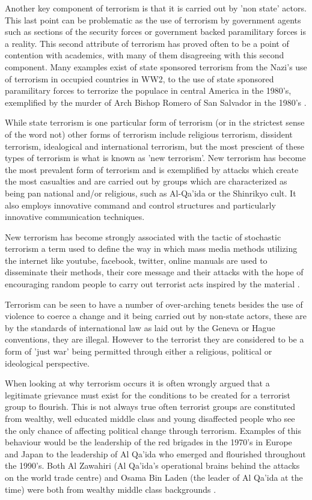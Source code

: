 Another key component of terrorism is that it is carried out by 'non state' actors. This last point can be problematic as the use of terrorism by government agents such as sections of the security forces or government backed paramilitary forces is a reality. This second attribute of terrorism has proved often to be a point of contention with academics, with many of them disagreeing with this second component. Many examples exist of state sponsored terrorism from the Nazi's use of terrorism in occupied countries in WW2, to the use of state sponsored paramilitary forces to terrorize the populace in central America in the  1980's, exemplified by the murder of Arch Bishop Romero of San Salvador in the 1980's \citep{romero1998violence}. 

While state terrorism is one particular form of terrorism (or in the strictest sense of the word not) other forms of terrorism include religious terrorism, dissident terrorism, idealogical and international terrorism, but the most prescient of these types of terrorism is what is known as 'new terrorism'. New terrorism has become the most prevalent form of terrorism and is exemplified by attacks which create the most casualties and are carried out by groups which are characterized as being pan national and/or religious, such as Al-Qa'ida or the Shinrikyo cult. It also employs innovative command and control structures and particularly innovative communication techniques. 

New terrorism has become strongly associated with the tactic of stochastic terrorism a term used to define the way in which mass media methods utilizing the internet like youtube, facebook, twitter, online manuals are used to disseminate their methods, their core message and their attacks with the hope of encouraging random people to carry out terrorist acts inspired by the material \citep{margulies2016trump}. 

Terrorism can be seen to have a number of over-arching tenets besides the use of violence to coerce a change and it being carried out by non-state actors, these are by the standards of international law as laid out by the Geneva or Hague conventions, they are illegal. However to the terrorist they are considered to be a form of 'just war' being permitted through either a religious, political or ideological perspective.

When looking at why terrorism occurs it is often wrongly argued that a legitimate grievance must exist for the conditions to be created for a terrorist group to flourish. This is not always true often terrorist groups are constituted from wealthy, well educated middle class and young disaffected people who see the only chance of affecting political change through terrorism. Examples of this behaviour would be the leadership of the red brigades in the 1970's in Europe and Japan to the leadership of Al Qa'ida who emerged and flourished throughout the 1990's. Both Al Zawahiri (Al Qa'ida's operational brains behind the attacks on the world trade centre) and Osama Bin Laden (the leader of Al Qa'ida at the time) were both from wealthy middle class backgrounds \citep{henzel2005origins}.

